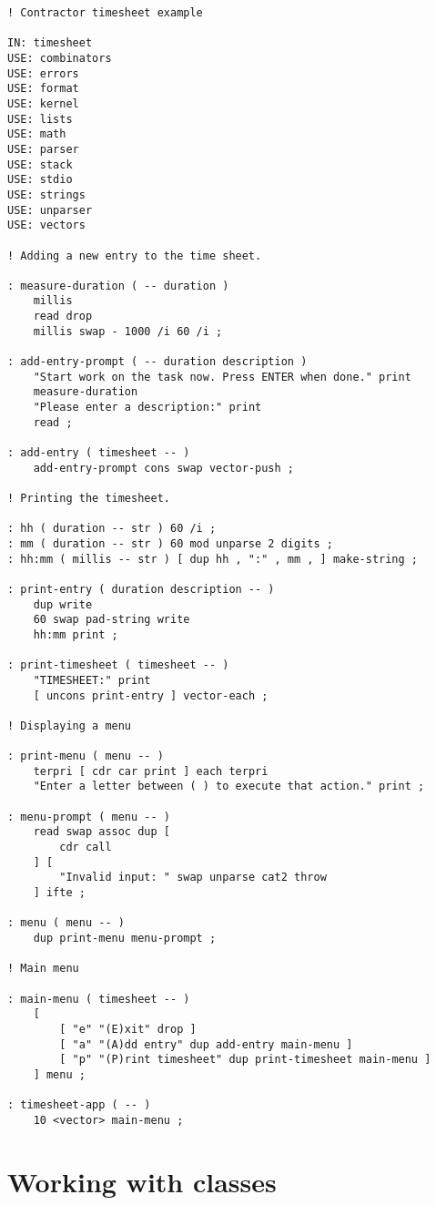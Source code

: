 \documentclass[english]{book}
\begin{document}
\begin{verbatim}
! Contractor timesheet example

IN: timesheet
USE: combinators
USE: errors
USE: format
USE: kernel
USE: lists
USE: math
USE: parser
USE: stack
USE: stdio
USE: strings
USE: unparser
USE: vectors

! Adding a new entry to the time sheet.

: measure-duration ( -- duration )
    millis
    read drop
    millis swap - 1000 /i 60 /i ;

: add-entry-prompt ( -- duration description )
    "Start work on the task now. Press ENTER when done." print
    measure-duration
    "Please enter a description:" print
    read ;

: add-entry ( timesheet -- )
    add-entry-prompt cons swap vector-push ;

! Printing the timesheet.

: hh ( duration -- str ) 60 /i ;
: mm ( duration -- str ) 60 mod unparse 2 digits ;
: hh:mm ( millis -- str ) [ dup hh , ":" , mm , ] make-string ;

: print-entry ( duration description -- )
    dup write
    60 swap pad-string write
    hh:mm print ;

: print-timesheet ( timesheet -- )
    "TIMESHEET:" print
    [ uncons print-entry ] vector-each ;

! Displaying a menu

: print-menu ( menu -- )
    terpri [ cdr car print ] each terpri
    "Enter a letter between ( ) to execute that action." print ;

: menu-prompt ( menu -- )
    read swap assoc dup [
        cdr call
    ] [
        "Invalid input: " swap unparse cat2 throw
    ] ifte ;

: menu ( menu -- )
    dup print-menu menu-prompt ;

! Main menu

: main-menu ( timesheet -- )
    [
        [ "e" "(E)xit" drop ]
        [ "a" "(A)dd entry" dup add-entry main-menu ]
        [ "p" "(P)rint timesheet" dup print-timesheet main-menu ]
    ] menu ;

: timesheet-app ( -- )
    10 <vector> main-menu ;
\end{verbatim}

\chapter{Working with classes}
\end{document}
